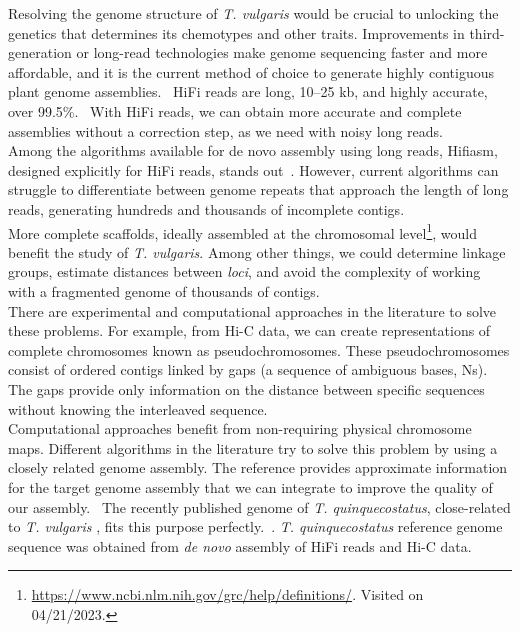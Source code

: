 Resolving the genome structure of \textit{T. vulgaris} would be crucial to unlocking the genetics that determines its chemotypes and other traits. Improvements in third-generation or long-read technologies make genome sequencing faster and more affordable, and it is the current method of choice to generate highly contiguous plant genome assemblies.~\cite{puckerPlantGenomeSequence2022} \ac{HiFi} reads are long, 10–25 kb, and highly accurate, over 99.5\%.~\cite{honHighlyAccurateLongread2020} With \ac{HiFi} reads, we can obtain more accurate and complete assemblies without a correction step, as we need with noisy long reads.~\cite{puckerPlantGenomeSequence2022}\\

Among the algorithms available for de novo assembly using long reads, Hifiasm, designed explicitly for \ac{HiFi} reads, stands out~\cite{chengHaplotyperesolvedNovoAssembly2021}. However, current algorithms can struggle to differentiate between genome repeats that approach the length of long reads, generating hundreds and thousands of incomplete contigs.~\cite{huangAlignGraph2SimilarGenomeassisted2021} \\

More complete scaffolds, ideally assembled at the chromosomal level\footnote{\url{https://www.ncbi.nlm.nih.gov/grc/help/definitions/}. Visited on 04/21/2023.}, would benefit the study of \textit{T. vulgaris}. Among other things, we could determine linkage groups, estimate distances between \textit{loci}, and avoid the complexity of working with a fragmented genome of thousands of contigs.~\cite{tamazianChromosomerReferencebasedGenome2016}\\

There are experimental and computational approaches in the literature to solve these problems. For example, from \ac{Hi-C} data, we can create representations of complete chromosomes known as pseudochromosomes. These pseudochromosomes consist of ordered contigs linked by gaps (a sequence of ambiguous bases, Ns). The gaps provide only information on the distance between specific sequences without knowing the interleaved sequence.~\cite{puckerPlantGenomeSequence2022}\\

Computational approaches benefit from non-requiring physical chromosome maps. Different algorithms in the literature try to solve this problem by using a closely related genome assembly. The reference provides approximate information for the target genome assembly that we can integrate to improve the quality of our assembly.~\cite{huangAlignGraph2SimilarGenomeassisted2021}  The recently published genome of \textit{T. quinquecostatus}, close-related to \textit{T. vulgaris} \cite{sunPopulationDiversityAnalyses2023},  fits this purpose perfectly.~\cite{sunChromosomelevelAssemblyAnalysis2022}. \textit{T. quinquecostatus} reference genome sequence was obtained from \textit{de novo} assembly of  \ac{HiFi} reads and \ac{Hi-C} data.\\ 

